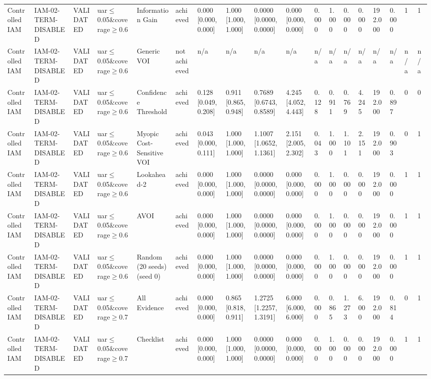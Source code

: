 \begin{table}[!ht]
{\begin{tabular}{llllllllllllllllll}
Controlled IAM & IAM-02-TERM-DISABLED & VALIDATED & uar$\le$0.05\&coverage$\ge$0.6 & Information Gain & achieved & 0.000 [0.000, 0.000] & 1.000 [1.000, 1.000] & 0.0000 [0.0000, 0.0000] & 0.000 [0.000, 0.000] & 0.000 & 1.000 & 0.000 & 0.000 & 192.000 & 0.000 & 1 & 1 \\
Controlled IAM & IAM-02-TERM-DISABLED & VALIDATED & uar$\le$0.05\&coverage$\ge$0.6 & Generic VOI & not achieved & n/a & n/a & n/a & n/a & n/a & n/a & n/a & n/a & n/a & n/a & n/a & n/a \\
Controlled IAM & IAM-02-TERM-DISABLED & VALIDATED & uar$\le$0.05\&coverage$\ge$0.6 & Confidence Threshold & achieved & 0.128 [0.049, 0.208] & 0.911 [0.865, 0.948] & 0.7689 [0.6743, 0.8589] & 4.245 [4.052, 4.443] & 0.128 & 0.911 & 0.769 & 4.245 & 192.000 & 0.897 & 0 & 0 \\
Controlled IAM & IAM-02-TERM-DISABLED & VALIDATED & uar$\le$0.05\&coverage$\ge$0.6 & Myopic Cost-Sensitive VOI & achieved & 0.043 [0.000, 0.111] & 1.000 [1.000, 1.000] & 1.1007 [1.0652, 1.1361] & 2.151 [2.005, 2.302] & 0.043 & 1.000 & 1.101 & 2.151 & 192.000 & 0.903 & 0 & 1 \\
Controlled IAM & IAM-02-TERM-DISABLED & VALIDATED & uar$\le$0.05\&coverage$\ge$0.6 & Lookahead-2 & achieved & 0.000 [0.000, 0.000] & 1.000 [1.000, 1.000] & 0.0000 [0.0000, 0.0000] & 0.000 [0.000, 0.000] & 0.000 & 1.000 & 0.000 & 0.000 & 192.000 & 0.000 & 1 & 1 \\
Controlled IAM & IAM-02-TERM-DISABLED & VALIDATED & uar$\le$0.05\&coverage$\ge$0.6 & AVOI & achieved & 0.000 [0.000, 0.000] & 1.000 [1.000, 1.000] & 0.0000 [0.0000, 0.0000] & 0.000 [0.000, 0.000] & 0.000 & 1.000 & 0.000 & 0.000 & 192.000 & 0.000 & 1 & 1 \\
Controlled IAM & IAM-02-TERM-DISABLED & VALIDATED & uar$\le$0.05\&coverage$\ge$0.6 & Random (20 seeds) (seed 0) & achieved & 0.000 [0.000, 0.000] & 1.000 [1.000, 1.000] & 0.0000 [0.0000, 0.0000] & 0.000 [0.000, 0.000] & 0.000 & 1.000 & 0.000 & 0.000 & 192.000 & 0.000 & 1 & 1 \\
Controlled IAM & IAM-02-TERM-DISABLED & VALIDATED & uar$\le$0.05\&coverage$\ge$0.7 & All Evidence & achieved & 0.000 [0.000, 0.000] & 0.865 [0.818, 0.911] & 1.2725 [1.2257, 1.3191] & 6.000 [6.000, 6.000] & 0.000 & 0.865 & 1.273 & 6.000 & 192.000 & 0.814 & 0 & 1 \\
Controlled IAM & IAM-02-TERM-DISABLED & VALIDATED & uar$\le$0.05\&coverage$\ge$0.7 & Checklist & achieved & 0.000 [0.000, 0.000] & 1.000 [1.000, 1.000] & 0.0000 [0.0000, 0.0000] & 0.000 [0.000, 0.000] & 0.000 & 1.000 & 0.000 & 0.000 & 192.000 & 0.000 & 1 & 1 \\

\end{tabular}}
\end{table}
